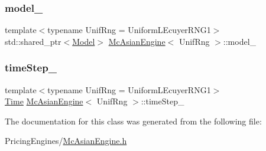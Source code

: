 \subsubsection{\texorpdfstring{model\+\_\+}{model\_}}
{\footnotesize\ttfamily template$<$typename Unif\+Rng  = Uniform\+L\+Ecuyer\+R\+N\+G1$>$ \\
std\+::shared\+\_\+ptr$<$\hyperlink{class_model}{Model}$>$ \hyperlink{class_mc_asian_engine}{Mc\+Asian\+Engine}$<$ Unif\+Rng $>$\+::model\+\_\+\hspace{0.3cm}{\ttfamily [private]}}

\hypertarget{class_mc_asian_engine_a44bf438e294ec6b6475e85412422ec54}{}\label{class_mc_asian_engine_a44bf438e294ec6b6475e85412422ec54} 
\subsubsection{\texorpdfstring{time\+Step\+\_\+}{timeStep\_}}
{\footnotesize\ttfamily template$<$typename Unif\+Rng  = Uniform\+L\+Ecuyer\+R\+N\+G1$>$ \\
\hyperlink{_name_def_8h_ac2d3e0ba793497bcca555c7c2cf64ff3}{Time} \hyperlink{class_mc_asian_engine}{Mc\+Asian\+Engine}$<$ Unif\+Rng $>$\+::time\+Step\+\_\+\hspace{0.3cm}{\ttfamily [private]}}



The documentation for this class was generated from the following file\+:\begin{DoxyCompactItemize}
\item 
Pricing\+Engines/\hyperlink{_mc_asian_engine_8h}{Mc\+Asian\+Engine.\+h}\end{DoxyCompactItemize}
